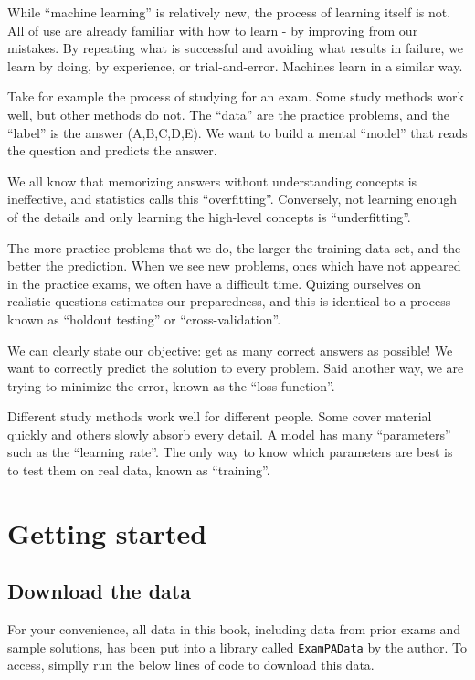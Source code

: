 \documentclass[openany]{book}
\begin{document}
While ``machine learning'' is relatively new, the process of learning itself is not. All of use are already familiar with how to learn - by improving from our mistakes. By repeating what is successful and avoiding what results in failure, we learn by doing, by experience, or trial-and-error. Machines learn in a similar way.

Take for example the process of studying for an exam. Some study methods work well, but other methods do not. The ``data'' are the practice problems, and the ``label'' is the answer (A,B,C,D,E). We want to build a mental ``model'' that reads the question and predicts the answer.

We all know that memorizing answers without understanding concepts is ineffective, and statistics calls this ``overfitting''. Conversely, not learning enough of the details and only learning the high-level concepts is ``underfitting''.

The more practice problems that we do, the larger the training data set, and the better the prediction. When we see new problems, ones which have not appeared in the practice exams, we often have a difficult time. Quizing ourselves on realistic questions estimates our preparedness, and this is identical to a process known as ``holdout testing'' or ``cross-validation''.

We can clearly state our objective: get as many correct answers as possible! We want to correctly predict the solution to every problem. Said another way, we are trying to minimize the error, known as the ``loss function''.

Different study methods work well for different people. Some cover material quickly and others slowly absorb every detail. A model has many ``parameters'' such as the ``learning rate''. The only way to know which parameters are best is to test them on real data, known as ``training''.

\hypertarget{getting-started}{%
\chapter{Getting started}\label{getting-started}}

\hypertarget{download-the-data}{%
\section{Download the data}\label{download-the-data}}

For your convenience, all data in this book, including data from prior exams and sample solutions, has been put into a library called \texttt{ExamPAData} by the author. To access, simplly run the below lines of code to download this data.
\end{document}
